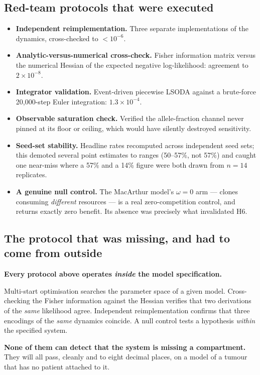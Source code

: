 \documentclass[11pt,a4paper]{article}
\begin{document}
\subsection{Red-team protocols that were executed}

\begin{itemize}[leftmargin=1.4em,itemsep=0.25em]
\item \textbf{Independent reimplementation.} Three separate implementations of the
dynamics, cross-checked to $<10^{-6}$.
\item \textbf{Analytic-versus-numerical cross-check.} Fisher information matrix versus
the numerical Hessian of the expected negative log-likelihood: agreement to
$2\times10^{-8}$.
\item \textbf{Integrator validation.} Event-driven piecewise LSODA against a
brute-force 20{,}000-step Euler integration: $1.3\times10^{-4}$.
\item \textbf{Observable saturation check.} Verified the allele-fraction channel never
pinned at its floor or ceiling, which would have silently destroyed sensitivity.
\item \textbf{Seed-set stability.} Headline rates recomputed across independent seed
sets; this demoted several point estimates to ranges (50--57\%, not 57\%) and caught one
near-miss where a 57\% and a 14\% figure were both drawn from $n=14$ replicates.
\item \textbf{A genuine null control.} The MacArthur model's $\omega = 0$ arm --- clones
consuming \emph{different} resources --- is a real zero-competition control, and returns
exactly zero benefit. Its absence was precisely what invalidated H6.
\end{itemize}

\subsection{The protocol that was missing, and had to come from outside}
\label{sec:h7}

\begin{tcolorbox}[warnbox]
\textbf{Every protocol above operates \emph{inside} the model specification.}

Multi-start optimisation searches the parameter space of a given model. Cross-checking
the Fisher information against the Hessian verifies that two derivations of the
\emph{same} likelihood agree. Independent reimplementation confirms that three encodings
of the \emph{same} dynamics coincide. A null control tests a hypothesis
\emph{within} the specified system.

\textbf{None of them can detect that the system is missing a compartment.} They will all
pass, cleanly and to eight decimal places, on a model of a tumour that has no patient
attached to it.
\end{tcolorbox}
\end{document}
